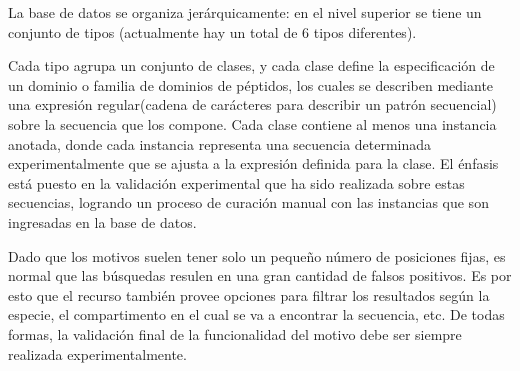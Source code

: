 La base de datos se organiza jerárquicamente: en el nivel superior se tiene un conjunto de tipos (actualmente hay un total de 6 tipos diferentes). 

Cada tipo agrupa un conjunto de clases, y cada clase define la especificación de un dominio o familia de dominios de péptidos, 
los cuales se describen mediante una expresión regular(cadena de carácteres para describir un patrón secuencial\cite{regex}) sobre la secuencia que los compone.
Cada clase contiene al menos una instancia anotada, donde cada instancia representa una secuencia determinada experimentalmente que se ajusta a la expresión definida para la clase.
El énfasis está puesto en la validación experimental que ha sido realizada sobre estas secuencias, logrando un proceso de curación manual con las instancias que son ingresadas en la base de datos.

Dado que los motivos suelen tener solo un pequeño número de posiciones fijas, es normal que las búsquedas resulen en una gran cantidad de falsos positivos.  
Es por esto que el recurso también provee opciones para filtrar los resultados según la especie, el compartimento en el cual se va a encontrar la secuencia, etc. 
De todas formas, la validación final de la funcionalidad del motivo debe ser siempre realizada experimentalmente.



